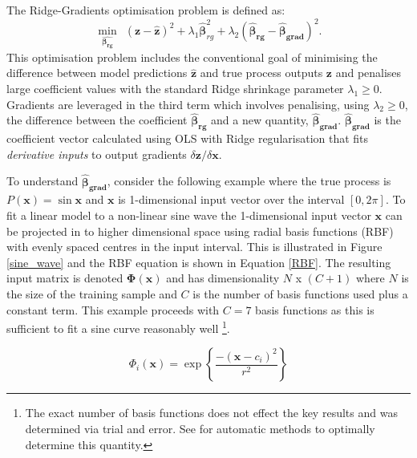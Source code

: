 \documentclass{article}
\begin{document}
The Ridge-Gradients optimisation problem is defined as:
\begin{equation}
	\label{rg_opt}
\min_{\hat{\boldsymbol{\beta_{rg}}}} \ \ (\mathbf{z} -\mathbf{\hat{z}})^2 + \lambda_1 \hat{\boldsymbol{\beta}}_{rg}^2 + \lambda_2 (\boldsymbol{\hat{\beta}_{rg}} - \boldsymbol{\hat{\beta}_{grad}})^2.
\end{equation}
This optimisation problem includes the conventional goal of minimising the difference between model predictions $\mathbf{\hat{z}}$ and true process outputs $\mathbf{z}$ and penalises large coefficient values with the standard Ridge shrinkage parameter $\lambda_1 \geq 0$. Gradients are leveraged in the third term which involves penalising, using $\lambda_2 \geq 0$, the difference between the coefficient   $\boldsymbol{\hat{\beta}_{rg}}$ and a new quantity, $ \boldsymbol{\hat{\beta}_{grad}}$. $\boldsymbol{\hat{\beta}_{grad}}$ is the coefficient vector calculated using OLS with Ridge regularisation that fits \textit{derivative inputs} to output gradients $\delta \mathbf{z}/\delta \mathbf{x}$.

To understand $\boldsymbol{\hat{\beta}_{grad}}$, consider the following example where the true process is $P(\mathbf{x}) = \sin{\mathbf{x}}$ and $\mathbf{x}$ is 1-dimensional input vector over the interval $[0, 2 \pi]$. To fit a linear model to a non-linear sine wave the 1-dimensional input vector $\mathbf{x}$ can be projected in to higher dimensional space using radial basis functions (RBF) with evenly spaced centres in the input interval. This is illustrated in Figure  \ref{sine_wave} and the RBF equation is shown in  Equation \ref{RBF}. The resulting input matrix is denoted $\mathbf{\Phi(x)}$ and has dimensionality $N$ x $(C + 1)$ where $N$ is the size of the training sample and $C$ is the number of basis functions used plus a constant term. This example proceeds with $C = 7$ basis functions as this is sufficient to fit a sine curve reasonably well \footnote{The exact number of basis functions does not effect the key results and was determined via trial and error. See \cite{tipping2003fast} for automatic methods to optimally determine this quantity.}.

\begin{equation}
	\label{RBF}
	\Phi_i(\mathbf{x}) = \exp \left \{ \frac{-(\mathbf{x} - c_i)^2}{r^2} \right \} 
\end{equation}
\end{document}
